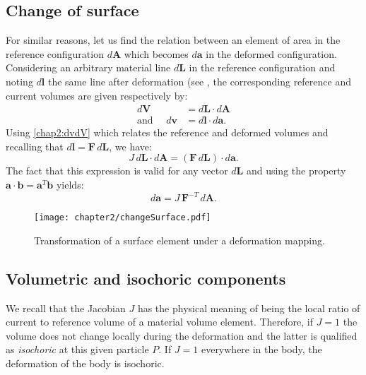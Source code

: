 	\subsection{Change of surface}
For similar reasons, let us find the relation between an element of area in the reference configuration $d\mathbf{A}$ which becomes $d\mathbf{a}$ in the deformed configuration. Considering an arbitrary material line $d\mathbf{L}$ in the reference configuration and noting $d\mathbf{l}$ the same line after deformation (see , the corresponding reference and current volumes are given respectively by:
\begin{align}
d\mathbf{V} &= d\mathbf{L} \cdot d\mathbf{A} \\
\mbox{and } \quad d\mathbf{v} &= d\mathbf{l} \cdot d\mathbf{a}.
\end{align}
Using \eqref{chap2:dvdV} which relates the reference and deformed volumes and recalling that $d\mathbf{l} = \mathbf{F} \, d\mathbf{L}$, we have:
\begin{equation}
J \, d\mathbf{L} \cdot d\mathbf{A} = (\mathbf{F} \, d\mathbf{L}) \cdot d\mathbf{a}.
\end{equation}
The fact that this expression is valid for any vector $d\mathbf{L}$ and using the property $\mathbf{a} \cdot \mathbf{b} = \mathbf{a} ^{T} \mathbf{b}$ yields:
\begin{equation}
\label{chap2:dadA}
d\mathbf{a} = J \, \mathbf{F}^{-T} \, d\mathbf{A}.
\end{equation}
% 
\begin{figure}[h]
\begin{center}
\texttt{[image: chapter2/changeSurface.pdf]}
\end{center}
\caption{Transformation of a surface element under a deformation mapping. }
\label{chap2:fig-changeSurface}
\end{figure}
			
	\subsection{Volumetric and isochoric components}
We recall that the Jacobian $J$ has the physical meaning of being the local ratio of current to reference volume of a material volume element. Therefore, if $J = 1$ the volume does not change locally during the deformation and the latter is qualified as \emph{isochoric} at this given particle $P$. If $J = 1$ everywhere in the body, the deformation of the body is isochoric. 

